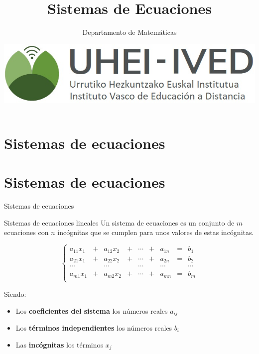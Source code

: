 \documentclass[9pt]{beamer}
\author{Departamento de Matemáticas}
\title{Sistemas de Ecuaciones}
\date{\includegraphics[scale=0.15]{imagenes/logoa.jpg}}
\begin{document}
\begin{frame}
\titlepage
\end{frame}

\begin{frame}
\tableofcontents
\end{frame}

\section{Sistemas de ecuaciones}

\section{Sistemas de ecuaciones}
\begin{frame}{Sistemas de ecuaciones}
\begin{alertblock}{Sistemas de ecuaciones lineales}
Un sistema de ecuaciones es un conjunto de $m$ ecuaciones con $n$ incógnitas que se cumplen para unos valores de estas incógnitas.

\[ \left\lbrace \begin{array}{ccccccccc}
a_{11} x_1 & + & a_{12}x_2 & + & \cdots & + & a_{1n} & = & b_1 \\
a_{21} x_1 & + & a_{22}x_2 &+ & \cdots & + & a_{2n} & = & b_2 \\
\cdots & & \cdots & &  \cdots & & \cdots & & \cdots \\
a_{m1} x_1 & + & a_{m2}x_2 & +& \cdots & + & a_{mn} & = & b_m \\
\end{array} \right. \]
\end{alertblock}
\pause

Siendo:

\begin{itemize}[<+->]
\item Los \textbf{coeficientes del sistema} los números reales $a_{ij}$
\item Los  \textbf{términos independientes} los números reales $b_i$
\item Las  \textbf{incógnitas} los términos $x_j$
\end{itemize}
\end{frame}
\end{document}
